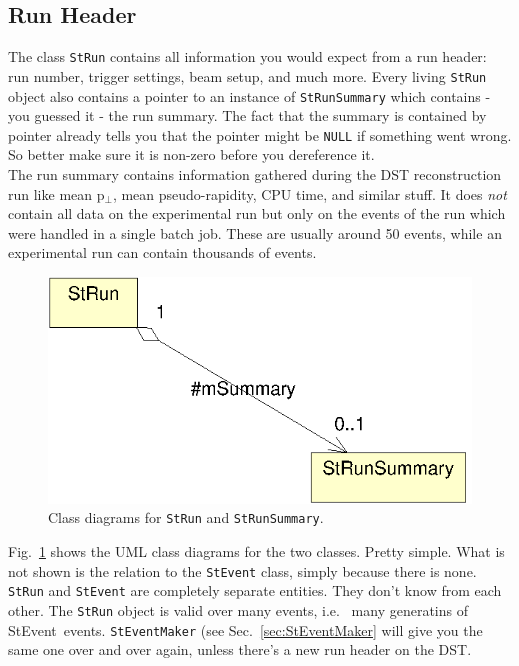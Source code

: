 \documentclass[twoside]{article}
\newcommand{\StEvent}{\textsf{StEvent}}
\begin{document}
\subsection{Run Header}
   

The class \texttt{StRun} contains all information you would expect
from a run header: run number, trigger settings, beam setup, and much
more. Every living \texttt{StRun} object also contains a pointer to an
instance of \texttt{StRunSummary} which contains - you guessed it -
the run summary.  The fact that the summary is contained by pointer
already tells you that the pointer might be \texttt{NULL} if something
went wrong. So better make sure it is non-zero before you dereference
it.\\
The run summary contains information gathered during the DST
reconstruction run like mean p$_\perp$, mean pseudo-rapidity, CPU
time, and similar stuff.  It does \emph{not} contain all data on the
experimental run but only on the events of the run which were handled
in a single batch job. These are usually around 50 events, while an
experimental run can contain thousands of events.
\begin{figure}[htb]
    \begin{center}
        \includegraphics{run.eps}
        \caption{Class diagrams for \texttt{StRun} and \texttt{StRunSummary}.}
        \label{fig:umlRun}
    \end{center}
\end{figure}
Fig.~\ref{fig:umlRun} shows the UML class diagrams for the two
classes. Pretty simple.  What is not shown is the relation to the
\texttt{StEvent} class, simply because there is none.  \texttt{StRun}
and \texttt{StEvent} are completely separate entities. They don't know
from each other.  The \texttt{StRun} object is valid over many events,
i.e.~ many generatins of \StEvent\ events.  \texttt{StEventMaker} (see
Sec.~\ref{sec:StEventMaker} will give you the same one over and over
again, unless there's a new run header on the DST.
\end{document}
